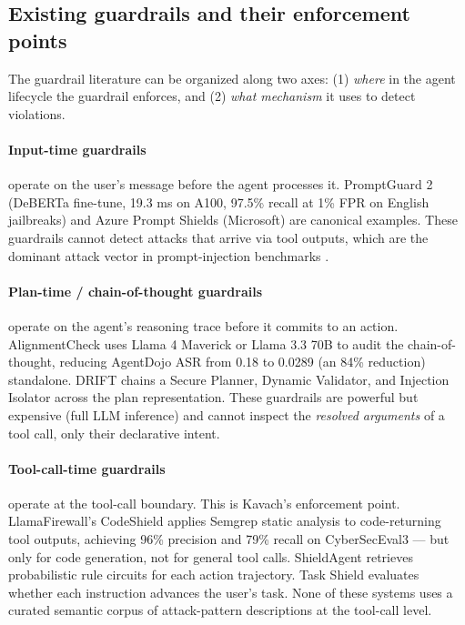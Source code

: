 \documentclass[sigconf,anonymous,review]{acmart}
\begin{document}
\subsection{Existing guardrails and their enforcement points}

The guardrail literature can be organized along two axes: (1) \emph{where} in
the agent lifecycle the guardrail enforces, and (2) \emph{what mechanism}
it uses to detect violations.

\paragraph{Input-time guardrails} operate on the user's message before the
agent processes it. PromptGuard 2 \cite{saxe2025llamafirewall} (DeBERTa fine-tune,
19.3 ms on A100, 97.5\% recall at 1\% FPR on English jailbreaks) and Azure Prompt
Shields (Microsoft) are canonical examples. These guardrails cannot detect attacks
that arrive via tool outputs, which are the dominant attack vector in
prompt-injection benchmarks \cite{zhan2024injecagent}.

\paragraph{Plan-time / chain-of-thought guardrails} operate on the agent's
reasoning trace before it commits to an action. AlignmentCheck \cite{saxe2025llamafirewall}
uses Llama 4 Maverick or Llama 3.3 70B to audit the chain-of-thought, reducing
AgentDojo ASR from 0.18 to 0.0289 (an 84\% reduction) standalone. DRIFT \cite{drift2026}
chains a Secure Planner, Dynamic Validator, and Injection Isolator across the
plan representation. These guardrails are powerful but expensive (full LLM
inference) and cannot inspect the \emph{resolved arguments} of a tool call,
only their declarative intent.

\paragraph{Tool-call-time guardrails} operate at the tool-call boundary. This is
Kavach's enforcement point. LlamaFirewall's CodeShield
\cite{saxe2025llamafirewall} applies Semgrep static analysis to code-returning
tool outputs, achieving 96\% precision and 79\% recall on CyberSecEval3 — but
only for code generation, not for general tool calls. ShieldAgent
\cite{chen2025shieldagent} retrieves probabilistic rule circuits for each action
trajectory. Task Shield \cite{jia2025taskshield} evaluates whether each
instruction advances the user's task. None of these systems uses a curated
semantic corpus of attack-pattern descriptions at the tool-call level.
\end{document}
